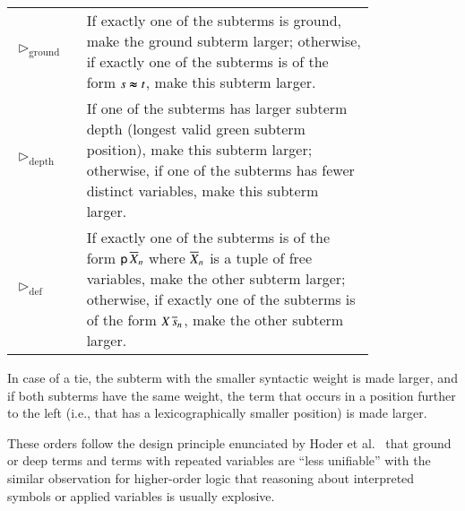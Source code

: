 \smallskip
\begin{tabular}{lp{0.8\linewidth}}
  $\vartriangleright_\text{ground}$ & If exactly one of the subterms is ground, make the
  ground subterm larger; otherwise, if exactly one of the subterms is of the form $s \pmb{\approx}
  t$, make this subterm larger. \\[2\jot]
  $\vartriangleright_\text{depth}$ & If one of the subterms has larger subterm depth
     (longest valid green subterm position), make this subterm larger; otherwise, if one of the
     subterms has fewer distinct variables, make this subterm larger. \\[2\jot]
  $\vartriangleright_\text{def}$ & If exactly one of the subterms is of the form
  $\mathsf{p}\,\overline{X}_{n}$ where $\overline{X}_{n}$ is a tuple of free variables, make
  the other subterm larger; otherwise, if exactly one of the subterms is of the form $X \,
  \overline{s}_{n}$, make the other subterm larger.
\end{tabular}
\smallskip

In case of a tie, the subterm with the smaller syntactic weight is made larger,
and if both subterms have the same weight, the term that occurs in a position further
to the left (i.e., that has a lexicographically smaller position) is made larger.

These orders follow the design principle enunciated by Hoder et
al.~\cite{hrsv-16-selsel} that ground or deep terms and terms with repeated
variables are ``less unifiable'' with the similar observation for higher-order
logic that reasoning about interpreted symbols or applied variables is usually
explosive.

